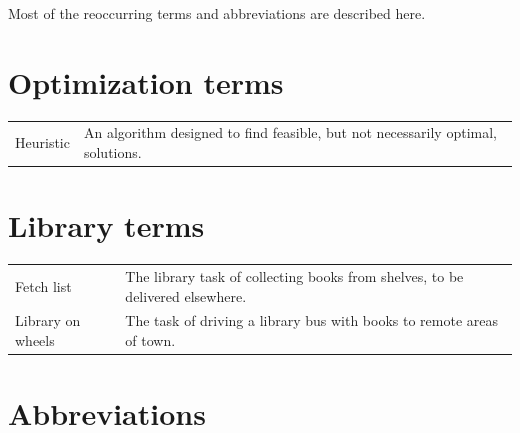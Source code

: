 \documentclass[a4paper, 10pt, twoside, openright]{book}
\begin{document}
Most of the reoccurring terms and abbreviations are described here.

\section*{Optimization terms}
\begin{tabular}{lp{10cm}}

Heuristic & An algorithm designed to find feasible, but not necessarily optimal, solutions. \\

\end{tabular}

\section*{Library terms}
\begin{tabular}{lp{10cm}}

Fetch list & The library task of collecting books from shelves, to be delivered elsewhere. \\
Library on wheels & The task of driving a library bus with books to remote areas of town. \\
\end{tabular}


\section*{Abbreviations}
\end{document}
